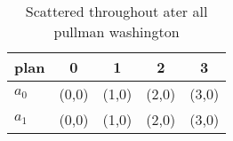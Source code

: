 \documentclass[a4paper]{article}
\begin{document}
\begin{table}
\begin{adjustbox}{width=0.6\columnwidth}
\begin{tabular}{|l|l|l|l|l|}
\hline
\textbf{plan} & \multicolumn{1}{c|}{\textbf{0}} & \multicolumn{1}{c|}{\textbf{1}} & \multicolumn{1}{c|}{\textbf{2}} & \multicolumn{1}{c|}{\textbf{3}} \\ \hline
\textbf{$a_0$}  & (0,0) & (1,0) & (2,0) & (3,0) \\ \hline
\textbf{$a_1$}  & (0,0) & (1,0) & (2,0) & (3,0) \\ \hline
\end{tabular}
\end{adjustbox}
\caption{Scattered throughout ater all pullman washington 
}
\end{table}
\end{document}
